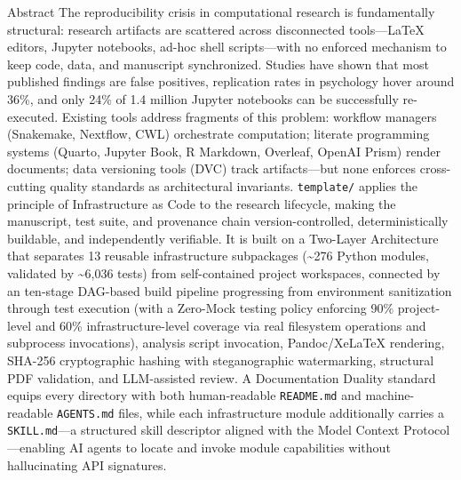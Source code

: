 \documentclass[
  ignorenonframetext,
]{beamer}
\author{\texorpdfstring{}{}}
\date{}
\begin{document}
\begin{frame}[fragile]{Abstract}
\protect{}\label{abstract}
The reproducibility crisis in computational research is fundamentally
structural: research artifacts are scattered across disconnected
tools---LaTeX editors, Jupyter notebooks, ad-hoc shell scripts---with no
enforced mechanism to keep code, data, and manuscript synchronized.
Studies have shown that most published findings are false positives,
replication rates in psychology hover around 36\%, and only 24\% of 1.4
million Jupyter notebooks can be successfully re-executed. Existing
tools address fragments of this problem: workflow managers (Snakemake,
Nextflow, CWL) orchestrate computation; literate programming systems
(Quarto, Jupyter Book, R Markdown, Overleaf, OpenAI Prism) render
documents; data versioning tools (DVC) track artifacts---but none
enforces cross-cutting quality standards as architectural invariants.
\texttt{template/} applies the principle of Infrastructure as Code to
the research lifecycle, making the manuscript, test suite, and
provenance chain version-controlled, deterministically buildable, and
independently verifiable. It is built on a Two-Layer Architecture that
separates 13 reusable infrastructure subpackages (\textasciitilde276
Python modules, validated by \textasciitilde6,036 tests) from
self-contained project workspaces, connected by an ten-stage DAG-based
build pipeline progressing from environment sanitization through test
execution (with a Zero-Mock testing policy enforcing 90\% project-level
and 60\% infrastructure-level coverage via real filesystem operations
and subprocess invocations), analysis script invocation, Pandoc/XeLaTeX
rendering, SHA-256 cryptographic hashing with steganographic
watermarking, structural PDF validation, and LLM-assisted review. A
Documentation Duality standard equips every directory with both
human-readable \texttt{README.md} and machine-readable
\texttt{AGENTS.md} files, while each infrastructure module additionally
carries a \texttt{SKILL.md}---a structured skill descriptor aligned with
the Model Context Protocol---enabling AI agents to locate and invoke
module capabilities without hallucinating API signatures.


\end{frame}
\end{document}
